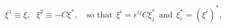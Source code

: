 \begin{equation*}
  \xi^1 \equiv \xi, ~~~ \xi^2 \equiv -C\xi^*,
  \quad \mbox{so that} ~~ \xi^i = \epsilon^{ij}C\xi^*_j 
  ~~ \mbox{and} ~~ \xi^*_i = (\xi^i)^*,
\end{equation*}

